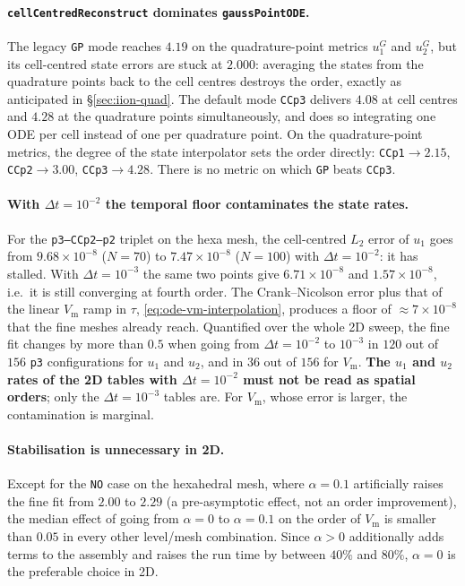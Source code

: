 \documentclass[11pt,a4paper]{article}
\newcommand{\code}[1]{\texttt{\small #1}}
\newcommand{\Vm}{V_{\text{m}}}
\begin{document}
\paragraph{\code{cellCentredReconstruct} dominates \code{gaussPointODE}.}
The legacy \code{GP} mode reaches $4.19$ on the quadrature-point metrics
$u_1^G$ and $u_2^G$, but its cell-centred state errors are stuck at $2.000$:
averaging the states from the quadrature points back to the cell centres
destroys the order, exactly as anticipated in \S\ref{sec:iion-quad}. The default
mode \code{CCp3} delivers $4.08$ at cell centres and $4.28$ at the quadrature
points simultaneously, and does so integrating one ODE per cell instead of one
per quadrature point. On the quadrature-point metrics, the degree of the state
interpolator sets the order directly: \code{CCp1}$\to2.15$,
\code{CCp2}$\to3.00$, \code{CCp3}$\to4.28$. There is no metric on which
\code{GP} beats \code{CCp3}.

\paragraph{With $\Delta t=10^{-2}$ the temporal floor contaminates the state
rates.}
For the \code{p3--CCp2--p2} triplet on the hexa mesh, the cell-centred $L_2$
error of $u_1$ goes from $9.68\times10^{-8}$ ($N=70$) to $7.47\times10^{-8}$
($N=100$) with $\Delta t=10^{-2}$: it has stalled. With $\Delta t=10^{-3}$ the
same two points give $6.71\times10^{-8}$ and $1.57\times10^{-8}$, i.e.\ it is
still converging at fourth order. The Crank--Nicolson error plus that of the
linear $\Vm$ ramp in $\tau$, \eqref{eq:ode-vm-interpolation}, produces a floor of
$\approx7\times10^{-8}$ that the fine meshes already reach. Quantified over the
whole 2D sweep, the fine fit changes by more than $0.5$ when going from
$\Delta t=10^{-2}$ to $10^{-3}$ in $120$ out of $156$ \code{p3} configurations
for $u_1$ and $u_2$, and in $36$ out of $156$ for $\Vm$. \textbf{The $u_1$ and
$u_2$ rates of the 2D tables with $\Delta t=10^{-2}$ must not be read as spatial
orders}; only the $\Delta t=10^{-3}$ tables are. For $\Vm$, whose error is
larger, the contamination is marginal.

\paragraph{Stabilisation is unnecessary in 2D.}
Except for the \code{NO} case on the hexahedral mesh, where $\alpha=0.1$
artificially raises the fine fit from $2.00$ to $2.29$ (a pre-asymptotic effect,
not an order improvement), the median effect of going from $\alpha=0$ to
$\alpha=0.1$ on the order of $\Vm$ is smaller than $0.05$ in every other
level/mesh combination. Since $\alpha>0$ additionally adds terms to the assembly
and raises the run time by between $40\%$ and $80\%$, $\alpha=0$ is the
preferable choice in 2D.
\end{document}

